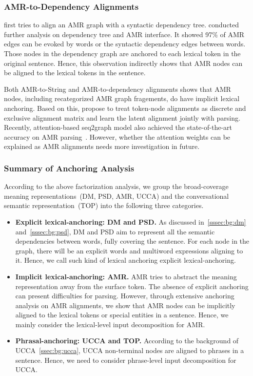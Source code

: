 \subsubsection{AMR-to-Dependency Alignments}
\label{sssec:lex-phr:amr-dep}
\citet{chen2017unsupervised} first tries to align an AMR graph with a
syntactic dependency tree.  \citet{szubert2018structured} conducted
further analysis on dependency tree and AMR interface. It showed 97\%
of AMR edges can be evoked by words or the syntactic dependency edges
between words.  Those nodes in the dependency graph are anchored to
each lexical token in the original sentence. Hence, this observation
indirectly shows that AMR nodes can be aligned to the lexical tokens
in the sentence.

Both AMR-to-String and AMR-to-dependency alignments shows that AMR
nodes, including recategorized AMR graph fragements, do have implicit
lexical anchoring. Based on this, \citet{lyu2018amr} propose to treat
token-node alignments as discrete and exclusive alignment matrix and
learn the latent alignment jointly with parsing. Recently,
attention-based seq2graph model also achieved the state-of-the-art
accuracy on AMR parsing~\citep{zhang-etal-2018-stog}.  However, whether
the attention weights can be explained as AMR alignments needs more
investigation in future.

\subsubsection{Summary of Anchoring Analysis}
\label{sssec:lex-phr:sum-anchoring}
According to the above factorization analysis, we group the
broad-coverage meaning representations~(DM, PSD, AMR, UCCA) and the
conversational semantic representation~(TOP) into the following three
categories.

\begin{itemize}
\item \textbf{Explicit lexical-anchoring: DM and PSD.} As discussed
  in~\autoref{sssec:bg:dm} and~\autoref{sssec:bg:psd}, DM and PSD aim
  to represent all the semantic dependencies between words, fully
  covering the sentence. For each node in the graph, there will be an
  explicit words and multiword expressions aligning to it. Hence, we
  call such kind of lexical anchoring explicit lexical-anchoring.

\item \textbf{Implicit lexical-anchoring: AMR.} AMR tries to abstract
  the meaning representation away from the surface token. The absence
  of explicit anchoring can present difficulties for parsing. However,
  through extensive anchoring analysis on AMR alignments, we show that
  AMR nodes can be implicitly aligned to the lexical tokens or special
  entities in a sentence. Hence, we mainly consider the lexical-level
  input decomposition for AMR.

\item \textbf{Phrasal-anchoring: UCCA and TOP.} According to the
background of UCCA~\autoref{ssec:bg:ucca}, UCCA non-terminal nodes are
aligned to phrases in a sentence. Hence, we need to consider
phrase-level input decomposition for UCCA.
\end{itemize}

